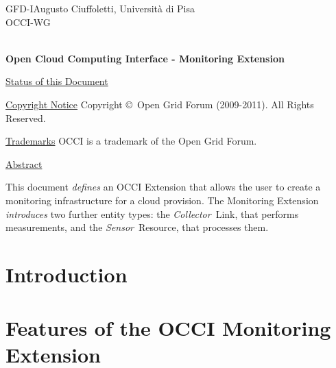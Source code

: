 \documentclass[10pt,a4paper]{article}
\newcommand{\doccode}{GFD-I}
\begin{document}
\thispagestyle{empty}

\doccode \hfill Augusto Ciuffoletti, Università di Pisa\\ 
OCCI-WG\\
\\

\vspace*{0.5in}

\begin{Large}
\textbf{Open Cloud Computing Interface - Monitoring Extension}
\end{Large}

\vspace*{0.5in}

\newcommand{\rem}[2]{}

\newcommand{\oc}[0]{\tt OCCI}
\newcommand{\mi}[0]{{\em mixin}}
\newcommand{\metr}[0]{{\em metric}}
\newcommand{\aggr}[0]{{\em aggregator}}
\newcommand{\publ}[0]{{\em publisher}}
\newcommand{\ent}[0]{{\em Entity}}
\newcommand{\rs}[0]{{\em Resource}}
\renewcommand{\ln}[0]{{\em Link}}
\newcommand{\sens}[0]{{\em Sensor}}
\newcommand{\comp}[0]{{\em Compute}}
\newcommand{\coll}[0]{{\em Collector}}

\underline{Status of this Document}


\underline{Copyright Notice}
Copyright \copyright ~Open Grid Forum (2009-2011). All Rights Reserved.

\underline{Trademarks}
OCCI is a trademark of the Open Grid Forum.

\underline{Abstract}


This document {\em defines} an OCCI Extension that allows the user to create a monitoring infrastructure for a cloud provision. The Monitoring Extension {\em introduces} two further entity types: the \coll\ Link, that performs measurements, and the \sens\ Resource, that processes them.

\newpage
\tableofcontents
\newpage

\section{Introduction}



\section{Features of the OCCI Monitoring Extension}
\end{document}
